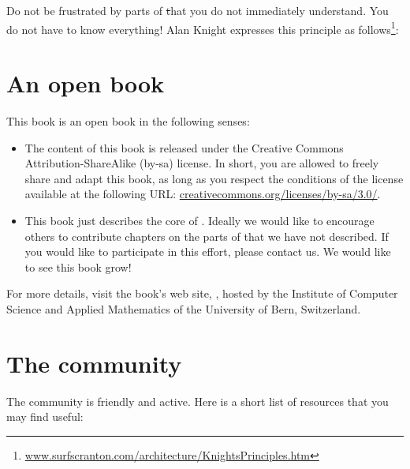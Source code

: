 \documentclass[a4paper,10pt,twoside]{book}
\begin{document}

Do not be frustrated by parts of \st that you do not immediately understand.
You do not have to know everything!
Alan Knight expresses this principle as follows\footnote{\url{www.surfscranton.com/architecture/KnightsPrinciples.htm}}:

\section*{An open book}

This book is an open book in the following senses: 

\begin{itemize}

\item	The content of this book is released under the Creative Commons Attribution-ShareAlike (by-sa) license.
		In short, you are allowed to freely share and adapt this book, as long as you respect the conditions of the license available at the following URL: 
		\url{creativecommons.org/licenses/by-sa/3.0/}.

\item	This book just describes the core of \sq.
		Ideally we would like to encourage others to contribute chapters
		on the parts of \sq that we have not described.
		If you would like to participate in this effort, please
		contact us.  We would like to see this book grow!
\end{itemize}

For more details, visit the book's web site, \sbe, hosted by the Institute of Computer Science and Applied Mathematics of the University of Bern, Switzerland.

\section*{The \sq community}

The \sq community is friendly and active.
Here is a short list of resources that you may find useful:
\end{document}
